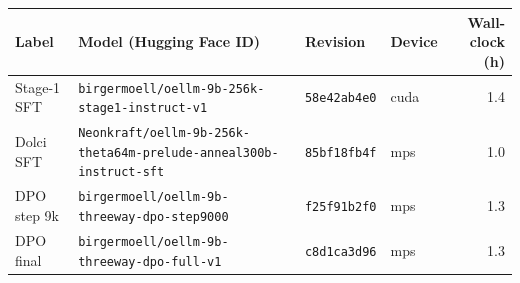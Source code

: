 \begin{tabular}{llllr}
\toprule
Label & Model (Hugging Face ID) & Revision & Device & Wall-clock (h) \\
\midrule
Stage-1 SFT & \scriptsize\texttt{birgermoell/oellm-9b-256k-stage1-instruct-v1} & \texttt{58e42ab4e0} & cuda & 1.4 \\
Dolci SFT & \scriptsize\texttt{Neonkraft/oellm-9b-256k-theta64m-prelude-anneal300b-instruct-sft} & \texttt{85bf18fb4f} & mps & 1.0 \\
DPO step 9k & \scriptsize\texttt{birgermoell/oellm-9b-threeway-dpo-step9000} & \texttt{f25f91b2f0} & mps & 1.3 \\
DPO final & \scriptsize\texttt{birgermoell/oellm-9b-threeway-dpo-full-v1} & \texttt{c8d1ca3d96} & mps & 1.3 \\
\bottomrule
\end{tabular}
